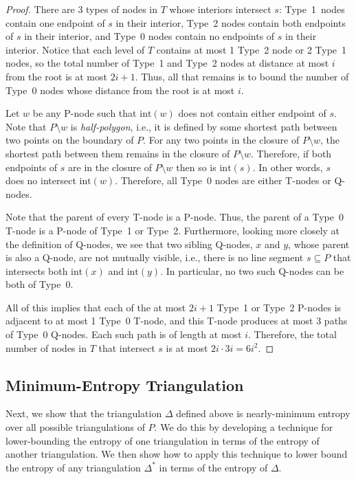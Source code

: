 \documentclass[lotsofwhite]{patmorin}
\newcommand{\interior}{\mathrm{int}}
\begin{document}
\begin{proof}
There are 3 types of nodes in $T$ whose interiors intersect $s$:
Type~1~nodes contain one endpoint of $s$ in their interior, Type~2
nodes contain both endpoints of $s$ in their interior, and Type~0
nodes contain no endpoints of $s$ in their interior.  Notice that each
level of $T$ contains at most 1 Type~2 node or 2 Type~1 nodes, so the
total number of Type~1 and Type~2 nodes at distance at most $i$ from
the root is at most $2i+1$.  Thus, all
that remains is to bound the number of Type~0 nodes whose distance
from the root is at most $i$.

Let $w$ be any P-node such that $\interior(w)$ does not contain either
endpoint of $s$.  Note that $P\setminus w$ is \emph{half-polygon}, i.e.,
it is defined by some shortest path between two points on the boundary
of $P$.  For any two points in the closure of $P\setminus w$, the shortest
path between them remains in the closure of $P\setminus w$.  Therefore,
if both endpoints of $s$ are in the closure of $P\setminus w$ then so
is $\interior(s)$.  In other words, $s$ does no intersect $\interior(w)$.
Therefore, all Type~0 nodes are either T-nodes or Q-nodes.

Note that the parent of every T-node is a P-node.  Thus, the parent of a
Type~0 T-node is a P-node of Type~1 or Type~2.  Furthermore, looking more
closely at the definition of Q-nodes, we see that two sibling Q-nodes,
$x$ and $y$, whose parent is also a Q-node, are not mutually visible,
i.e., there is no line segment $s\subseteq P$ that intersects both
$\interior(x)$ and $\interior(y)$.  In particular, no two such Q-nodes
can be both of Type~0.

All of this implies that each of the at most $2i+1$ Type~1 or Type~2
P-nodes is adjacent to at most 1 Type~0 T-node, and this T-node produces
at most 3 paths of Type~0 Q-nodes. Each such path is of length at most
$i$.  Therefore, the total number of nodes in $T$ that intersect $s$
is at most  $2i\cdot 3i=6i^2$.
\end{proof}

\subsection{Minimum-Entropy Triangulation}

Next, we show that the triangulation $\Delta$ defined above is
nearly-minimum entropy over all possible triangulations of $P$.  We do
this by developing a technique for lower-bounding the entropy of one
triangulation in terms of the entropy of another triangulation.  We
then show how to apply this technique to lower bound the entropy of
any triangulation $\Delta^*$ in terms of the entropy of $\Delta$.
  
\end{document}
